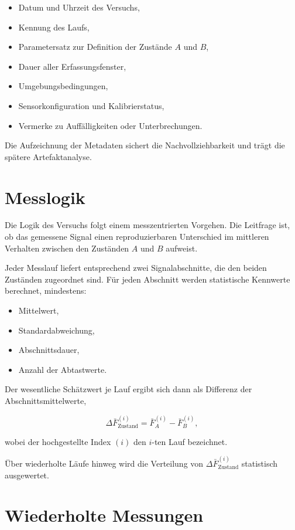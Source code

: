 \documentclass[12pt,a4paper]{report}
\begin{document}
\begin{itemize}
\item Datum und Uhrzeit des Versuchs,
\item Kennung des Laufs,
\item Parametersatz zur Definition der Zustände $A$ und $B$,
\item Dauer aller Erfassungsfenster,
\item Umgebungsbedingungen,
\item Sensorkonfiguration und Kalibrierstatus,
\item Vermerke zu Auffälligkeiten oder Unterbrechungen.
\end{itemize}

Die Aufzeichnung der Metadaten sichert die Nachvollziehbarkeit und trägt
die spätere Artefaktanalyse.

\section{Messlogik}

Die Logik des Versuchs folgt einem messzentrierten Vorgehen. Die
Leitfrage ist, ob das gemessene Signal einen reproduzierbaren Unterschied
im mittleren Verhalten zwischen den Zuständen $A$ und $B$ aufweist.

Jeder Messlauf liefert entsprechend zwei Signalabschnitte, die den beiden
Zuständen zugeordnet sind. Für jeden Abschnitt werden statistische
Kennwerte berechnet, mindestens:

\begin{itemize}
\item Mittelwert,
\item Standardabweichung,
\item Abschnittsdauer,
\item Anzahl der Abtastwerte.
\end{itemize}

Der wesentliche Schätzwert je Lauf ergibt sich dann als Differenz der
Abschnittsmittelwerte,

\begin{equation}
\Delta \bar{F}^{(i)}_{\text{Zustand}} = \bar{F}^{(i)}_{A} - \bar{F}^{(i)}_{B},
\end{equation}

wobei der hochgestellte Index $(i)$ den $i$-ten Lauf bezeichnet.

Über wiederholte Läufe hinweg wird die Verteilung von
$\Delta \bar{F}^{(i)}_{\text{Zustand}}$ statistisch ausgewertet.

\section{Wiederholte Messungen}
\end{document}
